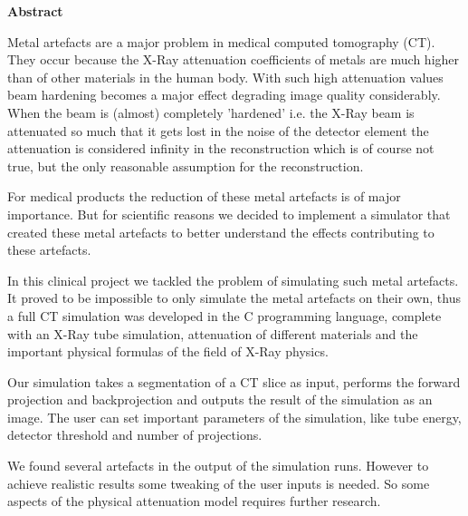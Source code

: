 

\clearemptydoublepage
{}
{}	





\vspace*{2cm}
\begin{center}
{\Large \bf Abstract}
\end{center}
\vspace{1cm}

\par Metal artefacts are a major problem in medical computed tomography (CT). They occur because the X-Ray attenuation coefficients of metals are much higher than of other materials in the human body. With such high attenuation values beam hardening becomes a major effect degrading image quality considerably. When the beam is (almost) completely 'hardened' i.e. the X-Ray beam is attenuated so much that it gets lost in the noise of the detector element the attenuation is considered infinity in the reconstruction which is of course not true, but the only reasonable assumption for the reconstruction.
\par For medical products the reduction of these metal artefacts is of major importance. But for scientific reasons we decided to implement a simulator that created these metal artefacts to better understand the effects contributing to these artefacts.
\par In this clinical project we tackled the problem of simulating such metal artefacts. It proved to be impossible to only simulate the metal artefacts on their own, thus a full CT simulation was developed in the C programming language, complete with an X-Ray tube simulation, attenuation of different materials and the important physical formulas of the field of X-Ray physics.
\par Our simulation takes a segmentation of a CT slice as input, performs the forward projection and backprojection and outputs the result of the simulation as an image. The user can set important parameters of the simulation, like tube energy, detector threshold and number of projections.
\par We found several artefacts in the output of the simulation runs. However to achieve realistic results some tweaking of the user inputs is needed. So some aspects of the physical attenuation model requires further research.
 
